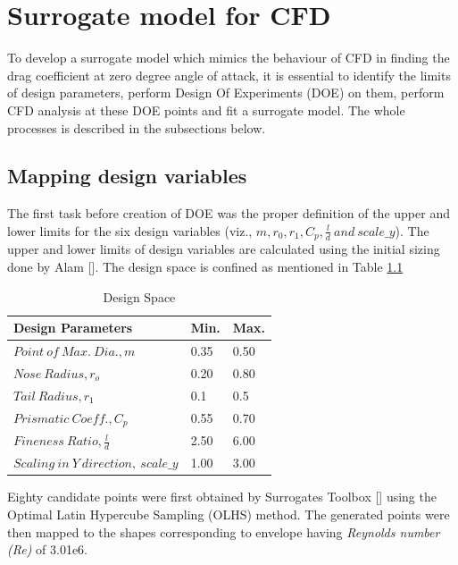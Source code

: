\chapter{Surrogate model for CFD}
\label{Surrogate model for CFD}
To develop a surrogate model which mimics the behaviour of CFD in finding the drag coefficient at zero degree angle of attack, it is essential to identify the limits of design parameters, perform Design Of Experiments (DOE) on them, perform CFD analysis at these DOE points and fit a surrogate model. The whole processes is described in the subsections below.

\section{Mapping design variables}
The first task before creation of DOE was the proper definition of the upper and lower limits for the six design variables (viz., $ m, r_0, r_1, C_p, \frac{l}{d} \ and \  scale \_y $). The upper and lower limits of design variables are calculated using the initial sizing done by Alam []. The design space is confined as mentioned in Table \ref{Degign space }

\begin{table}[H]
	\centering
	\caption{Design Space}
	\label{Degign space }
	\begin{tabular}{lll}
		\hline \hline
		Design Parameters & Min. & Max.    \\ \hline \hline
		
		$ Point\ of\ Max.\ Dia., m$ & 0.35 & 0.50     \\  
		$ Nose\ Radius, r _{o} $ & 0.20 & 0.80     \\
		$ Tail\ Radius, r _{1} $ & 0.1 & 0.5     \\  
		$ Prismatic\ Coeff., C _{p }$ & 0.55 & 0.70 \\
		$ Fineness\ Ratio, \frac{l}{d} $ &2.50 & 6.00 \\
		$Scaling\ in\ Y\ direction,\ scale\_y$ &1.00 & 3.00\\ \hline \hline
	\end{tabular}
\end{table}

Eighty candidate points were first obtained by Surrogates Toolbox [] using the Optimal Latin Hypercube Sampling (OLHS) method. The generated points were then mapped to the shapes corresponding to envelope having \textit{Reynolds number (Re)} of 3.01e6.

